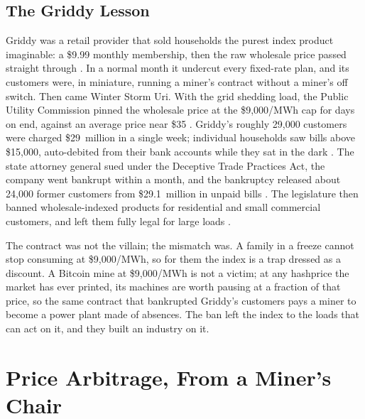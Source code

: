 \subsection*{The Griddy Lesson}

Griddy was a retail provider that sold households the purest index product imaginable: a \$9.99 monthly membership, then the raw wholesale price passed straight through \autocite{oxner2021griddybankruptcy}. %
In a normal month it undercut every fixed-rate plan, and its customers were, in miniature, running a miner's contract without a miner's off switch. Then came Winter Storm Uri. With the grid shedding load, the Public Utility Commission pinned the wholesale price at the \$9,000/MWh cap for days on end, against an average price near \$35 \autocite{oxner2021paxtongriddy}. %
Griddy's roughly 29,000 customers were charged \$29~million in a single week; individual households saw bills above \$15,000, auto-debited from their bank accounts while they sat in the dark \autocite{oxner2021griddybankruptcy,oxner2021paxtongriddy}. %
The state attorney general sued under the Deceptive Trade Practices Act, the company went bankrupt within a month, and the bankruptcy released about 24,000 former customers from \$29.1~million in unpaid bills \autocite{texasag2021griddy}. %
The legislature then banned wholesale-indexed products for residential and small commercial customers, and left them fully legal for large loads \autocite{texashb162021}. %

The contract was not the villain; the mismatch was. A family in a freeze cannot stop consuming at \$9,000/MWh, so for them the index is a trap dressed as a discount. A Bitcoin mine at \$9,000/MWh is not a victim; at any hashprice the market has ever printed, its machines are worth pausing at a fraction of that price, so the same contract that bankrupted Griddy's customers pays a miner to become a power plant made of absences. The ban left the index to the loads that can act on it, and they built an industry on it.

\section{Price Arbitrage, From a Miner's Chair}
\label{sec:arbitrage}

